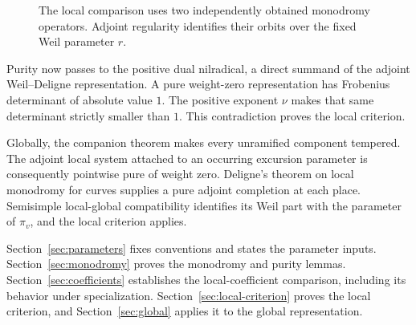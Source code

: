 \begin{figure}[tbp]
\centering
{}
\caption{The local comparison uses two independently obtained
monodromy operators. Adjoint regularity identifies their orbits
over the fixed Weil parameter $r$.}
\label{fig:comparison}
\end{figure}

Purity now passes to the positive dual nilradical, a direct summand
of the adjoint Weil--Deligne representation. A pure weight-zero
representation has Frobenius determinant of absolute value $1$.
The positive exponent $\nu$ makes that same determinant strictly
smaller than $1$. This contradiction proves the local criterion.

Globally, the companion theorem makes every unramified component
tempered. The adjoint local system attached to an occurring
excursion parameter is consequently pointwise pure of weight zero.
Deligne's theorem on local monodromy for curves
\cite[Th\'eor\`eme~1.8.4]{DeligneWeilII} supplies a pure adjoint
completion at each place. Semisimple local-global compatibility
identifies its Weil part with the parameter of $\pi_v$, and the
local criterion applies.

Section~\ref{sec:parameters} fixes conventions and states the
parameter inputs. Section~\ref{sec:monodromy} proves the monodromy
and purity lemmas. Section~\ref{sec:coefficients} establishes the
local-coefficient comparison, including its behavior under
specialization. Section~\ref{sec:local-criterion} proves the local
criterion, and Section~\ref{sec:global} applies it to the global
representation.
